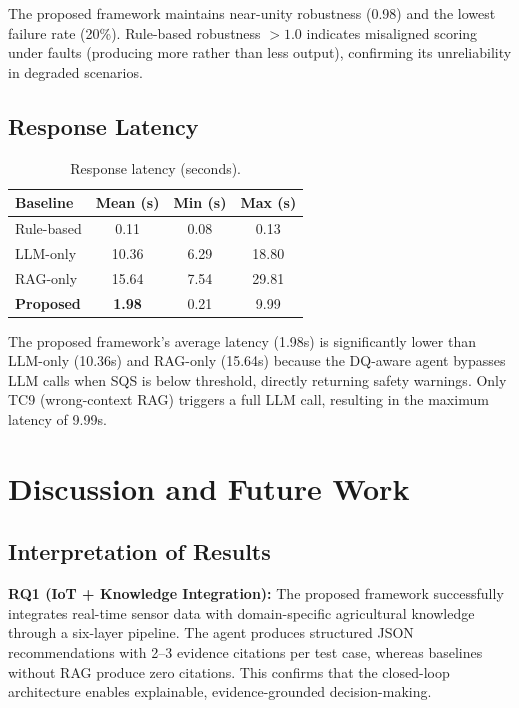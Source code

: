 \documentclass[runningheads]{llncs}
\begin{document}
The proposed framework maintains near-unity robustness (0.98) and the lowest failure rate (20\%). Rule-based robustness $>1.0$ indicates misaligned scoring under faults (producing more rather than less output), confirming its unreliability in degraded scenarios.

\subsection{Response Latency}
\begin{table}[htbp]
\caption{Response latency (seconds).}
\label{tab:latency}
\centering
\begin{tabular}{|l|c|c|c|}
\hline
\textbf{Baseline} & \textbf{Mean (s)} & \textbf{Min (s)} & \textbf{Max (s)} \\
\hline
Rule-based & 0.11 & 0.08 & 0.13 \\
\hline
LLM-only & 10.36 & 6.29 & 18.80 \\
\hline
RAG-only & 15.64 & 7.54 & 29.81 \\
\hline
\textbf{Proposed} & \textbf{1.98} & 0.21 & 9.99 \\
\hline
\end{tabular}
\end{table}

The proposed framework's average latency (1.98s) is significantly lower than LLM-only (10.36s) and RAG-only (15.64s) because the DQ-aware agent bypasses LLM calls when SQS is below threshold, directly returning safety warnings. Only TC9 (wrong-context RAG) triggers a full LLM call, resulting in the maximum latency of 9.99s.

\section{Discussion and Future Work}

\subsection{Interpretation of Results}

\noindent\textbf{RQ1 (IoT + Knowledge Integration):} The proposed framework successfully integrates real-time sensor data with domain-specific agricultural knowledge through a six-layer pipeline. The agent produces structured JSON recommendations with 2--3 evidence citations per test case, whereas baselines without RAG produce zero citations. This confirms that the closed-loop architecture enables explainable, evidence-grounded decision-making.
\end{document}
